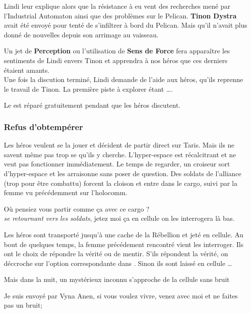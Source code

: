 Lindi leur explique alors que la résistance à eu vent des recherches mené par l'Industrial Automaton ainsi que des problèmes sur le Pelican. \textbf{Tinon Dystra} avait été envoyé pour tenté de s'infiltrer à bord du Pelican. Mais qu'il n'avait plus donné de nouvelles depuis son arrimage au vaisseau.

Un jet de \textbf{Perception} ou l'utilisation de \textbf{Sens de Force} fera apparaître les sentiments de Lindi envers Tinon et apprendra à nos héros que ces derniers étaient amants.\\

Une fois la discution terminé, Lindi demande de l'aide aux héros, qu'ils reprenne le travail de Tinon. La première piste à explorer étant \ldots {}.

Le  est réparé gratuitement pendant que les héros discutent.


\subsubsection{Refus d’obtempérer} \label{sec:refus-d-obtemperer}

Les héros veulent se la jouer et décident de partir direct sur Taris. Mais ils ne savent même pas trop se qu'ils y cherche. L'hyper-espace est récalcitrant et ne veut pas fonctionner immédiatement. Le temps de regarder, un croiseur sort d'hyper-espace et les arraisonne sans poser de question. Des soldats de l'alliance (trop pour être combattu) forcent la cloison et entre dans le cargo, suivi par la femme vu précédemment sur l'holocomm.

\begin{quotebox}
    Où pensiez vous partir comme ça avec ce cargo ? \\
    \emph{se retournant vers les soldats}, jetez moi ça en cellule on les interrogera là bas.
\end{quotebox}

Les héros sont transporté jusqu'à une cache de la Rébellion et jeté en cellule. Au bout de quelques temps, la femme précédement rencontré vient les interroger. Ils ont le choix de répondre la vérité ou de mentir. S'ils répondent la vérité, on déccroche sur l'option correspondante dans . Sinon ils sont laissé en cellule \ldots

Mais dans la nuit, un mystérieux inconnu s'approche de la cellule sans bruit

\begin{quotebox}
    Je suis envoyé par Vyna Anen, si vous voulez vivre, venez avec moi et ne faites pas un bruit; \\
\end{quotebox}

